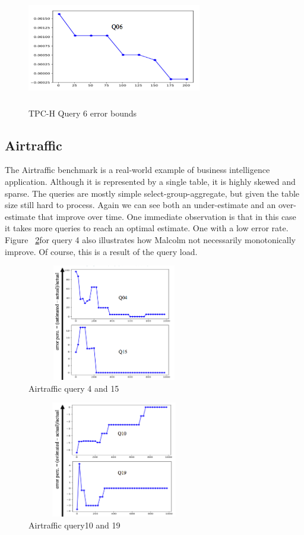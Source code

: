 \documentclass[conference]{IEEEtran}
\begin{document}
\begin{figure}[t!]
	\centering
	\includegraphics[height=2in,width=3in]{Figures/Q6.png}
	\caption{TPC-H Query 6 error bounds
		\label{fig:q6}}
\end{figure}


\subsection{Airtraffic}
The Airtraffic benchmark is a real-world example of  business intelligence application.
Although it is represented by a single table, it is highly skewed and sparse. The queries
are mostly simple select-group-aggregate, but given the table size still hard to process.
Again we can see both an under-estimate and an over-estimate that improve over time.
One immediate observation is that in this case it takes more queries to reach an optimal
estimate. One with a low error rate.
Figure ~\ref{fig:4-15}for query 4  also illustrates how Malcolm not necessarily monotonically
improve. Of course, this is a result of the query load.
\begin{figure}[t!]
	\centering
	\includegraphics[height=2in,width=3in]{Figures/Q4-15.png}
	\caption{Airtraffic query 4 and 15
		\label{fig:4-15}}
\end{figure}

\begin{figure}[t!]
	\centering
	\includegraphics[height=2in,width=3in]{Figures/Q10-19.png}
	\caption{Airtraffic query10 and 19
		\label{fig:q10-19}}
\end{figure}
\end{document}
